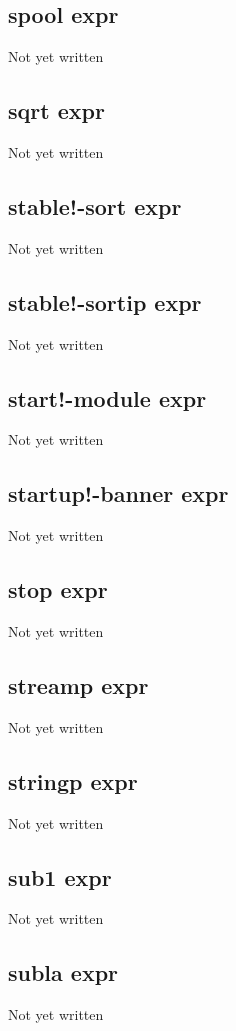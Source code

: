 \documentclass[a4paper,11pt]{article}
\begin{document}
\subsection{\ttfamily spool expr}
Not yet written

\subsection{\ttfamily sqrt expr}
Not yet written

\subsection{\ttfamily stable!-sort expr}
Not yet written

\subsection{\ttfamily stable!-sortip expr}
Not yet written

\subsection{\ttfamily start!-module expr}
Not yet written

\subsection{\ttfamily startup!-banner expr}
Not yet written

\subsection{\ttfamily stop expr}
Not yet written

\subsection{\ttfamily streamp expr}
Not yet written

\subsection{\ttfamily stringp expr}
Not yet written

\subsection{\ttfamily sub1 expr}
Not yet written

\subsection{\ttfamily subla expr}
Not yet written
\end{document}

